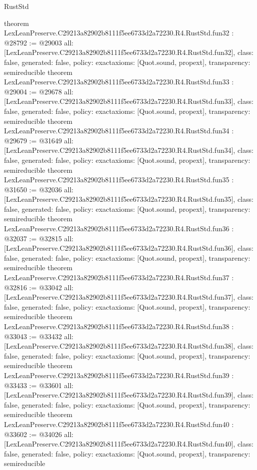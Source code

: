\begin{lexlean}{RustStd}
\begin{coremodule}
{}
theorem LexLeanPreserve.C29213a82902b8111f5ee6733d2a72230.R4.RustStd.fun32 : @28792 := @29003 {
  all: [LexLeanPreserve.C29213a82902b8111f5ee6733d2a72230.R4.RustStd.fun32],
  class: false,
  generated: false,
  policy: exact{axioms: [Quot.sound, propext]},
  transparency: semireducible
}
theorem LexLeanPreserve.C29213a82902b8111f5ee6733d2a72230.R4.RustStd.fun33 : @29004 := @29678 {
  all: [LexLeanPreserve.C29213a82902b8111f5ee6733d2a72230.R4.RustStd.fun33],
  class: false,
  generated: false,
  policy: exact{axioms: [Quot.sound, propext]},
  transparency: semireducible
}
theorem LexLeanPreserve.C29213a82902b8111f5ee6733d2a72230.R4.RustStd.fun34 : @29679 := @31649 {
  all: [LexLeanPreserve.C29213a82902b8111f5ee6733d2a72230.R4.RustStd.fun34],
  class: false,
  generated: false,
  policy: exact{axioms: [Quot.sound, propext]},
  transparency: semireducible
}
theorem LexLeanPreserve.C29213a82902b8111f5ee6733d2a72230.R4.RustStd.fun35 : @31650 := @32036 {
  all: [LexLeanPreserve.C29213a82902b8111f5ee6733d2a72230.R4.RustStd.fun35],
  class: false,
  generated: false,
  policy: exact{axioms: [Quot.sound, propext]},
  transparency: semireducible
}
theorem LexLeanPreserve.C29213a82902b8111f5ee6733d2a72230.R4.RustStd.fun36 : @32037 := @32815 {
  all: [LexLeanPreserve.C29213a82902b8111f5ee6733d2a72230.R4.RustStd.fun36],
  class: false,
  generated: false,
  policy: exact{axioms: [Quot.sound, propext]},
  transparency: semireducible
}
theorem LexLeanPreserve.C29213a82902b8111f5ee6733d2a72230.R4.RustStd.fun37 : @32816 := @33042 {
  all: [LexLeanPreserve.C29213a82902b8111f5ee6733d2a72230.R4.RustStd.fun37],
  class: false,
  generated: false,
  policy: exact{axioms: [Quot.sound, propext]},
  transparency: semireducible
}
theorem LexLeanPreserve.C29213a82902b8111f5ee6733d2a72230.R4.RustStd.fun38 : @33043 := @33432 {
  all: [LexLeanPreserve.C29213a82902b8111f5ee6733d2a72230.R4.RustStd.fun38],
  class: false,
  generated: false,
  policy: exact{axioms: [Quot.sound, propext]},
  transparency: semireducible
}
theorem LexLeanPreserve.C29213a82902b8111f5ee6733d2a72230.R4.RustStd.fun39 : @33433 := @33601 {
  all: [LexLeanPreserve.C29213a82902b8111f5ee6733d2a72230.R4.RustStd.fun39],
  class: false,
  generated: false,
  policy: exact{axioms: [Quot.sound, propext]},
  transparency: semireducible
}
theorem LexLeanPreserve.C29213a82902b8111f5ee6733d2a72230.R4.RustStd.fun40 : @33602 := @34026 {
  all: [LexLeanPreserve.C29213a82902b8111f5ee6733d2a72230.R4.RustStd.fun40],
  class: false,
  generated: false,
  policy: exact{axioms: [Quot.sound, propext]},
  transparency: semireducible
}
\end{coremodule}
\end{lexlean}
